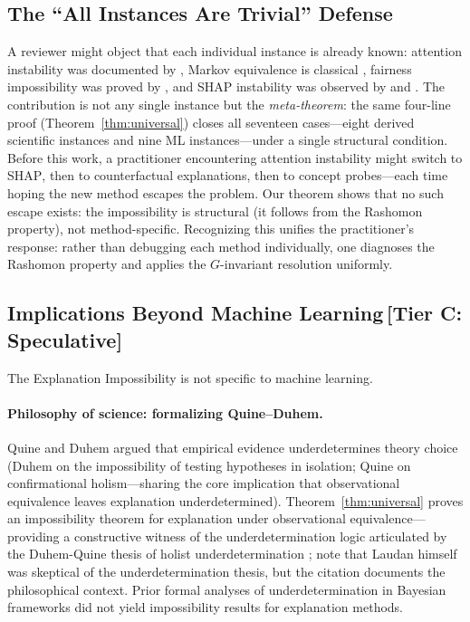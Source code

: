 \documentclass[11pt,a4paper]{article}
\newcommand{\SHAP}{\textsc{SHAP}}
\begin{document}
\subsection[The All Instances Are Trivial Defense]{The ``All Instances Are Trivial'' Defense}
\label{sec:trivial}

A reviewer might object that each individual instance is already known: attention
instability was documented by \citet{jainwallace2019}, Markov equivalence is
classical \citep{verma1991equivalence}, fairness impossibility was proved by
\citet{chouldechova2017fair}, and \SHAP{} instability was observed by
\citet{damour2022underspecification} and \citet{krishna2022disagreement}.  The
contribution is not any single instance but the \emph{meta-theorem}: the same
four-line proof (Theorem~\ref{thm:universal}) closes all seventeen cases---eight
derived scientific instances and nine ML instances---under a
single structural condition.  Before this work, a practitioner encountering
attention instability might switch to \SHAP{}, then to counterfactual
explanations, then to concept probes---each time hoping the new method escapes
the problem.  Our theorem shows that no such escape exists: the impossibility
is structural (it follows from the Rashomon property), not method-specific.
Recognizing this unifies the practitioner's response: rather than debugging each
method individually, one diagnoses the Rashomon property and applies the
$G$-invariant resolution uniformly.

\subsection{Implications Beyond Machine Learning\,\textnormal{\normalsize[Tier C: Speculative]}}
\label{sec:beyond-ml}

The Explanation Impossibility is not specific to machine learning.

\paragraph{Philosophy of science: formalizing Quine--Duhem.}
Quine \citep{quine1951dogmas} and Duhem \citep{duhem1906aim} argued that
empirical evidence underdetermines theory choice
(Duhem on the impossibility of testing hypotheses in isolation; Quine on
confirmational holism---sharing the core implication that observational
equivalence leaves explanation underdetermined).  Theorem~\ref{thm:universal}
proves an impossibility theorem for explanation under observational
equivalence---providing a constructive witness of the underdetermination logic
articulated by the Duhem-Quine thesis of holist underdetermination
\citep{laudan1991empirical}; note that Laudan himself was skeptical of the
underdetermination thesis, but the citation documents the philosophical context.
Prior formal analyses of underdetermination in Bayesian
frameworks \citep{dorling1979bayesian,howson2006scientific} did not yield
impossibility results for explanation methods.
\end{document}
